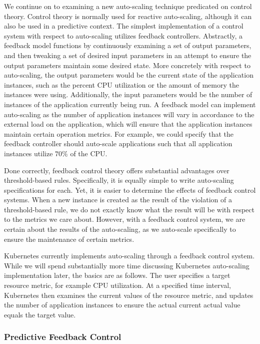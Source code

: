 We continue on to examining a new auto-scaling technique predicated on control
theory. Control theory is normally used for reactive auto-scaling, although it
can also be used in a predictive context. The simplest implementation of a
control system with respect to auto-scaling utilizes feedback
controllers.\cite[pg.
25]{auto-scaling-techniques-for-elastic-applications-in-cloud-environments}
Abstractly, a feedback model functions by continuously examining a set of output parameters,
and then tweaking a set of desired input parameters in an attempt to ensure the
output parameters maintain some desired state. More concretely with respect to
auto-scaling, the output parameters would be the current state of the
application instances, such as the percent CPU utilization or the amount of
memory the instances were using. Additionally, the input parameters would be the
number of instances of the application currently being run. A feedback model
can implement auto-scaling as the number of application instances will vary in
accordance to the external load on the application, which will ensure that the
application instances maintain certain operation metrics. For example, we could
specify that the feedback controller should auto-scale applications such that
all application instances utilize $70\%$ of the CPU.

Done correctly, feedback control theory offers substantial advantages over
threshold-based rules. Specifically, it is equally simple to write auto-scaling
specifications for each. Yet, it is easier to determine the effects of feedback
control systems. When a new instance is created as the result of the violation
of a threshold-based rule, we do not exactly know what the result will be with
respect to the metrics we care about. However, with a feedback control system,
we are certain about the results of the auto-scaling, as we auto-scale
specifically to ensure the maintenance of certain metrics.

Kubernetes currently implements auto-scaling through a feedback control system.
While we will spend substantially more time discussing Kubernetes auto-scaling
implementation later, the basics are as follows. The user specifies a target resource
metric, for example CPU utilization. At a specified time interval,
Kubernetes then examines the current values
of the resource metric, and updates the number of application instances to
ensure the actual current actual value equals the target
value.\cite{k8s-horizontal-pod-autoscaler-proposal}

\subsubsection{Predictive Feedback Control}


